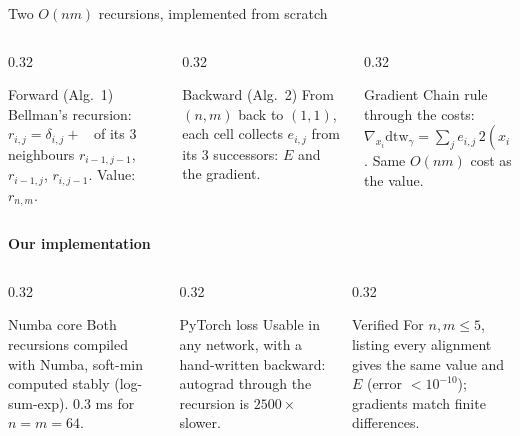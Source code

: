 \documentclass[aspectratio=169,11pt]{beamer}
\newcommand{\sdtw}{\mathrm{dtw}_\gamma}
\newcommand{\minop}{\mathop{\mathrm{min}^\gamma}}
\begin{document}
\begin{frame}{Two $O(nm)$ recursions, implemented from scratch}
\begin{columns}[T]
\begin{column}{0.32\textwidth}
\begin{block}{Forward (Alg.\ 1)}
Bellman's recursion: $r_{i,j}=\delta_{i,j}+\minop$ of its 3 neighbours $r_{i-1,j-1}$, $r_{i-1,j}$, $r_{i,j-1}$. Value: $r_{n,m}$.
\end{block}
\end{column}
\begin{column}{0.32\textwidth}
\begin{block}{Backward (Alg.\ 2)}
From $(n,m)$ back to $(1,1)$, each cell collects $e_{i,j}$ from its 3 successors: $E$ and the gradient.
\end{block}
\end{column}
\begin{column}{0.32\textwidth}
\begin{block}{Gradient}
Chain rule through the costs: $\nabla_{x_i}\sdtw=\sum_j e_{i,j}\,2(x_i-y_j)$. Same $O(nm)$ cost as the value.
\end{block}
\end{column}
\end{columns}
\vspace{0.2cm}
{\small\textbf{Our implementation}}
\begin{columns}[T]
\begin{column}{0.32\textwidth}
\begin{block}{Numba core}
Both recursions compiled with Numba, soft-min computed stably (log-sum-exp). $0.3$ ms for $n=m=64$.
\end{block}
\end{column}
\begin{column}{0.32\textwidth}
\begin{block}{PyTorch loss}
Usable in any network, with a hand-written backward: autograd through the recursion is $2500\times$ slower.
\end{block}
\end{column}
\begin{column}{0.32\textwidth}
\begin{block}{Verified}
For $n,m\le5$, listing every alignment gives the same value and $E$ (error $<10^{-10}$); gradients match finite differences.
\end{block}
\end{column}
\end{columns}
\end{frame}
\end{document}
